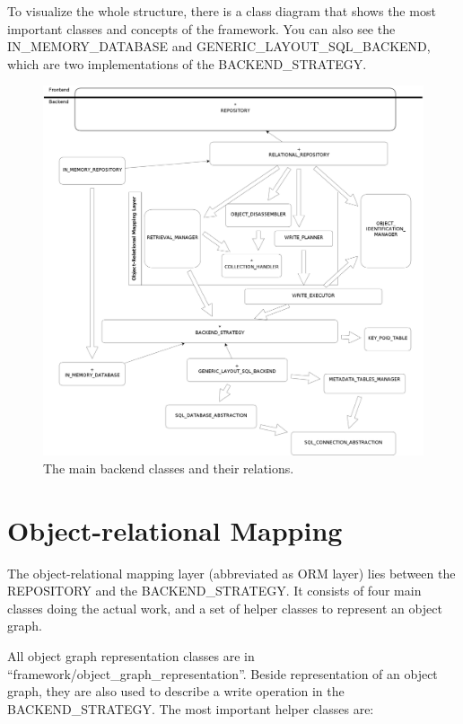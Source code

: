 To visualize the whole structure, there is a class diagram that shows the most important classes and concepts of the framework. 
You can also see the IN\_MEMORY\_DATABASE and GENERIC\_LAYOUT\_SQL\_BACKEND, which are two implementations of the BACKEND\_STRATEGY.

\begin{figure} [h]
\centering
\includegraphics[trim= 0mm -10mm 0mm -10mm,clip, width = 13cm] {backend.png}
\caption{The main backend classes and their relations.}
\label{fig:backend_classes}
\end{figure}


\section{Object-relational Mapping}
\label{section:ORM}

The object-relational mapping layer (abbreviated as ORM layer) lies between the REPOSITORY and the BACKEND\_STRATEGY.
It consists of four main classes doing the actual work, and a set of helper classes to represent an object graph.

All object graph representation classes are in ``framework/object\_graph\_representation''. 
Beside representation of an object graph, they are also used to describe a write operation in the BACKEND\_STRATEGY.
The most important helper classes are:


